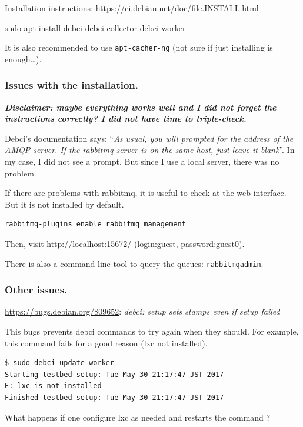 \documentclass[mingoth,a4paper]{jsarticle}
\begin{document}
{{Installation instructions:
\url{https://ci.debian.net/doc/file.INSTALL.html}

sudo apt install debci debci-collector debci-worker

It is also recommended to use \texttt{apt-cacher-ng} (not sure if just
installing is enough\ldots{}).

\subsubsection{Issues with the
installation.}\label{issues-with-the-installation.}

\textbf{\emph{Disclaimer: maybe everything works well and I did not
forget the instructions correctly? I did not have time to
triple-check.}}

Debci's documentation says: ``\emph{As usual, you will prompted for the
address of the AMQP server. If the rabbitmq-server is on the same host,
just leave it blank}''. In my case, I did not see a prompt. But since I
use a local server, there was no problem.

If there are problems with rabbitmq, it is useful to check at the web
interface. But it is not installed by default.

\begin{verbatim}
rabbitmq-plugins enable rabbitmq_management
\end{verbatim}

Then, visit \url{http://localhost:15672/} (login:guest,
password:guest0).

There is also a command-line tool to query the queues:
\texttt{rabbitmqadmin}.

\subsubsection{Other issues.}\label{other-issues.}

\url{https://bugs.debian.org/809652}: \emph{debci: setup sets stamps
even if setup failed}

This bugs prevents debci commands to try again when they should. For
example, this command fails for a good reason (lxc not installed).

\begin{verbatim}
$ sudo debci update-worker
Starting testbed setup: Tue May 30 21:17:47 JST 2017
E: lxc is not installed
Finished testbed setup: Tue May 30 21:17:47 JST 2017
\end{verbatim}

What happens if one configure lxc as needed and restarts the command ?

}}
\end{document}
